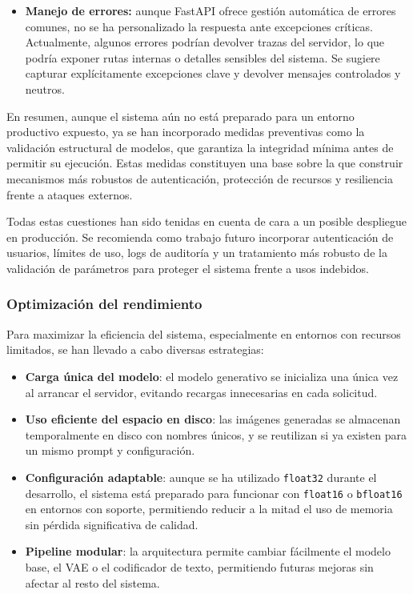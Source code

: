 \begin{itemize}
    \item \textbf{Manejo de errores:} aunque FastAPI ofrece gestión automática de errores comunes, no se ha personalizado la respuesta ante excepciones críticas. Actualmente, algunos errores podrían devolver trazas del servidor, lo que podría exponer rutas internas o detalles sensibles del sistema. Se sugiere capturar explícitamente excepciones clave y devolver mensajes controlados y neutros.
\end{itemize}

En resumen, aunque el sistema aún no está preparado para un entorno productivo expuesto, ya se han incorporado medidas preventivas como la validación estructural de modelos, que garantiza la integridad mínima antes de permitir su ejecución. Estas medidas constituyen una base sobre la que construir mecanismos más robustos de autenticación, protección de recursos y resiliencia frente a ataques externos.

Todas estas cuestiones han sido tenidas en cuenta de cara a un posible despliegue en producción. Se recomienda como trabajo futuro incorporar autenticación de usuarios, límites de uso, logs de auditoría y un tratamiento más robusto de la validación de parámetros para proteger el sistema frente a usos indebidos.


\subsubsection{Optimización del rendimiento}

Para maximizar la eficiencia del sistema, especialmente en entornos con recursos limitados, se han llevado a cabo diversas estrategias:

\begin{itemize}
    \item \textbf{Carga única del modelo}: el modelo generativo se inicializa una única vez al arrancar el servidor, evitando recargas innecesarias en cada solicitud.
    \item \textbf{Uso eficiente del espacio en disco}: las imágenes generadas se almacenan temporalmente en disco con nombres únicos, y se reutilizan si ya existen para un mismo prompt y configuración.
    \item \textbf{Configuración adaptable}: aunque se ha utilizado \texttt{float32} durante el desarrollo, el sistema está preparado para funcionar con \texttt{float16} o \texttt{bfloat16} en entornos con soporte, permitiendo reducir a la mitad el uso de memoria sin pérdida significativa de calidad.
    \item \textbf{Pipeline modular}: la arquitectura permite cambiar fácilmente el modelo base, el VAE o el codificador de texto, permitiendo futuras mejoras sin afectar al resto del sistema.
\end{itemize}

